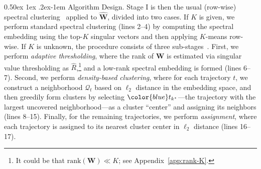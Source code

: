 \documentclass[twoside]{article}
\makeatletter
\renewcommand{\paragraph}{%
  \@startsection{paragraph}{4}%
  {\z@}{0.50ex \@plus 1ex \@minus .2ex}{-1em}%
  {\normalfont\normalsize\bfseries}%
}
\def\mW{{\bm{W}}}
\def\gQ{{\mathcal{Q}}}
\theoremstyle{plain}
\newcommand{\rank}{\mathrm{rank}}
\makeatother
\begin{document}
\paragraph{Algorithm Design.}
Stage I is then the usual (row-wise) spectral clustering~\citep{vonLuxburg2007spectral} applied to $\widehat{\mW}$, divided into two cases.
If $K$ is given, we perform standard spectral clustering (lines 2--4) by computing the spectral embedding using the top-$K$ singular vectors and then applying $K$-means row-wise.
If $K$ is unknown, the procedure consists of three sub-stages~\citep{kannan2009spectral,yun2016labeled,Vuren2024bmc}.
First, we perform \emph{adaptive thresholding}, where the rank of $\mW$ is estimated via singular value thresholding as $\widehat{R}$,\footnote{It could be that $\rank(\mW) \ll K$; see Appendix~\ref{app:rank-K}.} and a low-rank spectral embedding is formed (lines 6--7).
Second, we perform \emph{density-based clustering}, where for each trajectory $t$, we construct a neighborhood $\gQ_t$ based on $\ell_2$ distance in the embedding space, and then greedily form clusters by selecting ${\color{blue}t_{k^\star}}$---the trajectory with the largest uncovered neighborhood---as a cluster ``center'' and assigning its neighbors (lines 8--15).
Finally, for the remaining trajectories, we perform \emph{assignment}, where each trajectory is assigned to its nearest cluster center in $\ell_2$ distance (lines 16--17).
\end{document}
